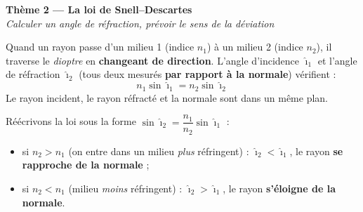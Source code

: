 \documentclass[11pt,a4paper]{article}
\begin{document}

\begin{center}
{\LARGE\bfseries\color{primarydark} Thème 2 — La loi de Snell–Descartes}\\[2pt]
{\color{primary}\itshape Calculer un angle de réfraction, prévoir le sens de la déviation}
\end{center}

\begin{cle}
Quand un rayon passe d'un milieu 1 (indice $n_1$) à un milieu 2 (indice $n_2$), il traverse le
\emph{dioptre} en \textbf{changeant de direction}. L'angle d'incidence $\hat{\imath}_1$ et l'angle
de réfraction $\hat{\imath}_2$ (tous deux mesurés \textbf{par rapport à la normale}) vérifient :
\[ \boxed{\,n_1\sin\hat{\imath}_1 = n_2\sin\hat{\imath}_2\,} \]
Le rayon incident, le rayon réfracté et la normale sont dans un même plan.
\end{cle}

\begin{cle}
Réécrivons la loi sous la forme $\sin\hat{\imath}_2=\dfrac{n_1}{n_2}\sin\hat{\imath}_1$ :
\begin{itemize}[leftmargin=1.6em,topsep=2pt,itemsep=1pt]
  \item si $n_2>n_1$ (on entre dans un milieu \emph{plus} réfringent) : $\hat{\imath}_2<\hat{\imath}_1$,
        le rayon \textbf{se rapproche de la normale} ;
  \item si $n_2<n_1$ (milieu \emph{moins} réfringent) : $\hat{\imath}_2>\hat{\imath}_1$, le rayon
        \textbf{s'éloigne de la normale}.
\end{itemize}
\end{cle}
\end{document}
